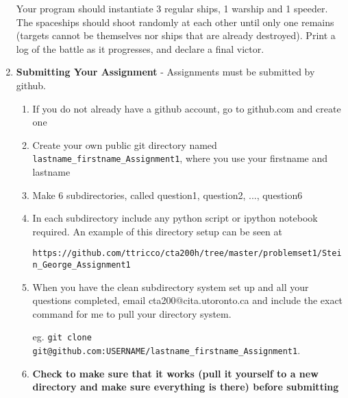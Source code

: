 \documentclass[]{article}
\begin{document}
\begin{enumerate}
Your program should instantiate 3 regular ships, 1 warship and 1 speeder. The spaceships should shoot randomly at each other until only one remains (targets cannot be themselves nor ships that are already destroyed). Print a log of the battle as it progresses, and declare a final victor.


\item \textbf{Submitting Your Assignment} - Assignments must be submitted by github.

\begin{enumerate}
\item If you do not already have a github account, go to github.com and create one
\item Create your own public git directory named \verb|lastname_firstname_Assignment1|, where you use your firstname and lastname
\item Make 6 subdirectories, called question1, question2, ..., question6
\item In each subdirectory include any python script or ipython notebook required. An example of this directory setup can be seen at
 
\hspace{-2cm}\verb|https://github.com/ttricco/cta200h/tree/master/problemset1/Stein_George_Assignment1|
\item When you have the clean subdirectory system set up and all your questions completed, email cta200@cita.utoronto.ca and include the exact command for me to pull your directory system. 

eg. \verb|git clone git@github.com:USERNAME/lastname_firstname_Assignment1|. 
\item \textbf{Check to make sure that it works (pull it yourself to a new directory and make sure everything is there) before submitting}

\end{enumerate}
\end{enumerate}
\end{document}
